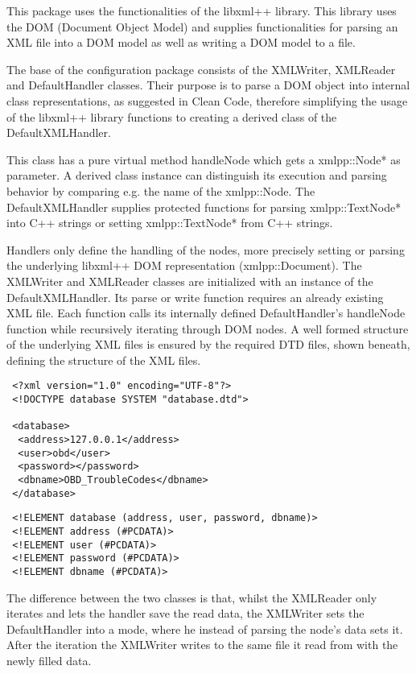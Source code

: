 This package uses the functionalities of the libxml++ library. This library uses the DOM (Document Object Model) and supplies functionalities 
for parsing an XML file into a DOM model as well as writing a DOM model to a file. 

The base of the configuration package consists of the XMLWriter, XMLReader and DefaultHandler classes. Their purpose is to parse a DOM object 
into internal class representations, as suggested in Clean Code, therefore simplifying the usage of the libxml++ library functions to creating 
a derived class of the DefaultXMLHandler. 

This class has a pure virtual method handleNode which gets a xmlpp::Node* as parameter. A derived class instance can distinguish its execution 
and parsing behavior by comparing e.g. the name of the xmlpp::Node. The DefaultXMLHandler supplies protected functions for parsing 
xmlpp::TextNode* into C++ strings or setting xmlpp::TextNode* from C++ strings. 

Handlers only define the handling of the nodes, more precisely setting  or parsing the underlying libxml++ DOM representation (xmlpp::Document). 
The XMLWriter and XMLReader classes are initialized with an instance of the DefaultXMLHandler. Its parse or write function requires an already 
existing XML file. Each function calls its internally defined DefaultHandler’s handleNode function while recursively iterating through DOM nodes. 
A well formed structure of the underlying XML files is ensured by the required DTD files, shown beneath, defining the structure of the XML files.

\begin{verbatim}
 <?xml version="1.0" encoding="UTF-8"?>
 <!DOCTYPE database SYSTEM "database.dtd">

 <database>
  <address>127.0.0.1</address>
  <user>obd</user>
  <password></password>
  <dbname>OBD_TroubleCodes</dbname>
 </database>
\end{verbatim}

\begin{verbatim}
 <!ELEMENT database (address, user, password, dbname)>
 <!ELEMENT address (#PCDATA)>
 <!ELEMENT user (#PCDATA)>
 <!ELEMENT password (#PCDATA)>
 <!ELEMENT dbname (#PCDATA)>
\end{verbatim}

The difference between the two classes is that, whilst the XMLReader only iterates and lets the handler save the read data, the XMLWriter sets 
the DefaultHandler into a mode, where he instead of parsing the node’s data sets it. After the iteration the XMLWriter writes to the same file 
it read from with the newly filled data.
